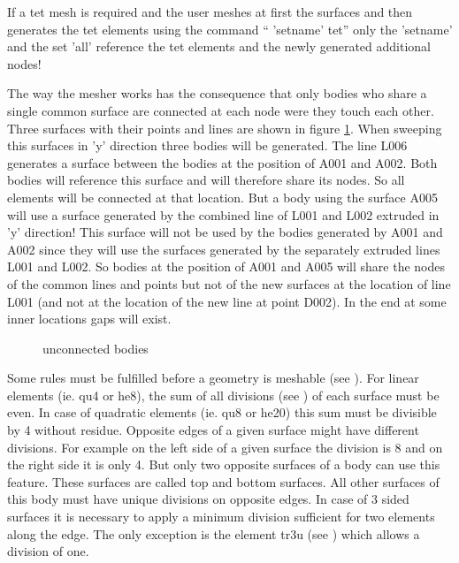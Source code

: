 \documentclass{article}
\begin{document}
If a tet mesh is required and the user meshes at first the surfaces and then generates the tet elements using the command `` 'setname' tet'' only the 'setname' and the set 'all' reference the tet elements and the newly generated additional nodes!

The way the mesher works has the consequence that only bodies who share a single common surface are connected at each node were they touch each other. Three surfaces with their points and lines are shown in figure \ref{unconnectedBodies}. When sweeping this surfaces in 'y' direction three bodies will be generated. The line L006 generates a surface between the bodies at the position of A001 and A002. Both bodies will reference this surface and will therefore share its nodes. So all elements will be connected at that location. But a body using the surface A005 will use a surface generated by the combined line of L001 and L002 extruded in 'y' direction! This surface will not be used by the bodies generated by A001 and A002 since they will use the surfaces generated by the separately extruded lines L001 and L002. So bodies at the position of A001 and A005 will share the nodes of the common lines and points but not of the new surfaces at the location of line L001 (and not at the location of the new line at point D002). In the end at some inner locations gaps will exist.
  
\begin{figure}[h]
\caption{\label{unconnectedBodies} unconnected bodies}
\end{figure}
 
Some rules must be fulfilled before a geometry is meshable (see ). For linear elements (ie. qu4 or he8), the sum of all divisions (see ) of each surface must be even. In case of quadratic elements (ie. qu8 or he20) this sum must be divisible by 4 without residue. Opposite edges of a given surface might have different divisions. For example on the left side of a given surface the division is 8 and on the right side it is only 4. But only two opposite surfaces of a body can use this feature. These surfaces are called top and bottom surfaces. All other surfaces of this body must have unique divisions on opposite edges. In case of 3 sided surfaces it is necessary to apply a minimum division sufficient for two elements along the edge. The only exception is the element tr3u (see ) which allows a division of one.
\end{document}
